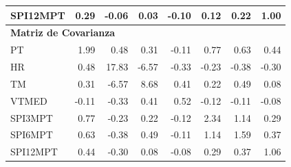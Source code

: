 \begin{table}[ht]
\begin{tabular}{lrrrrrrr}
SPI12MPT & 0.29 & -0.06 & 0.03 & -0.10 & 0.12 & 0.22 & 1.00 \\
\midrule
\multicolumn{8}{l}{\textbf{Matriz de Covarianza}} \\
\midrule
PT       & 1.99 & 0.48 & 0.31 & -0.11 & 0.77 & 0.63 & 0.44 \\
HR       & 0.48 & 17.83 & -6.57 & -0.33 & -0.23 & -0.38 & -0.30 \\
TM       & 0.31 & -6.57 & 8.68 & 0.41 & 0.22 & 0.49 & 0.08 \\
VTMED    & -0.11 & -0.33 & 0.41 & 0.52 & -0.12 & -0.11 & -0.08 \\
SPI3MPT  & 0.77 & -0.23 & 0.22 & -0.12 & 2.34 & 1.14 & 0.29 \\
SPI6MPT  & 0.63 & -0.38 & 0.49 & -0.11 & 1.14 & 1.59 & 0.37 \\
SPI12MPT & 0.44 & -0.30 & 0.08 & -0.08 & 0.29 & 0.37 & 1.06 \\
\bottomrule
\end{tabular}
\end{table}





